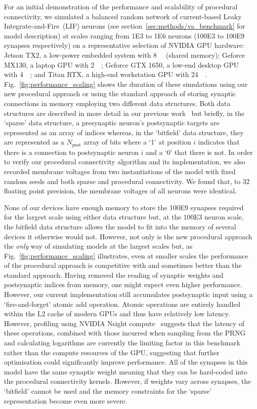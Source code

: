 \documentclass[9pt,a4paper]{amsart}
\begin{document}
For an initial demonstration of the performance and scalability of procedural connectivity, we simulated a balanced random network of current-based Leaky Integrate-and-Fire~(LIF) neurons (see section~\ref{sec:methods/va_benchmark} for model description) at scales ranging from \num{1E3} to \num{1E6} neurons (\num{100E3} to \num{100E9} synapses respectively) on a representative selection of NVIDIA GPU hardware:
Jetson TX2, a low-power embedded system with \SI{8}{\giga\byte} (shared memory);
Geforce MX130, a laptop GPU with \SI{2}{\giga\byte};
Geforce GTX 1650, a low-end desktop GPU with \SI{4}{\giga\byte};
and Titan RTX, a high-end workstation GPU with \SI{24}{\giga\byte}.
Fig.~\ref{fig:performance_scaling} shows the duration of these simulations using our new procedural approach or using the standard approach of storing synaptic connections in memory employing two different data structures.
Both data structures are described in more detail in our previous work~\citep{Knight2018} but briefly, in the `sparse' data structure, a presynaptic neuron's postsynaptic targets are represented as an array of indices whereas, in the `bitfield' data structure, they are represented as a $N_{\text{post}}$ array of bits where a `1' at position $i$ indicates that there is a connection to postsynaptic neuron $i$ and a `0' that there is not.
In order to verify our procedural connectivity algorithm and its implementation, we also recorded membrane voltages from two instantiations of the model with fixed random seeds and both sparse and procedural connectivity.
We found that, to \SI{32}{\bit} floating point  precision, the membrane voltages of all neurons were identical.

None of our devices have enough memory to store the \num{100E9} synapses required for the largest scale using either data structure but, at the \num{100E3} neuron scale, the bitfield data structure allows the model to fit into the memory of several devices it otherwise would not.
However, not only is the new procedural approach the \emph{only} way of simulating models at the largest scales but, as Fig.~\ref{fig:performance_scaling} illustrates, even at smaller scales the performance of the procedural approach is competitive with and sometimes better than the standard approach.
Having removed the reading of synaptic weights and postsynaptic indices from memory, one might expect even higher performance. 
However, our current implementation still accumulates postsynaptic input using a `fire-and-forget' atomic add operation.
Atomic operations are entirely handled within the L2 cache of modern GPUs and thus have relatively low latency.
However, profiling using NVIDIA Nsight compute~\citep{NVIDIACorporation2020} suggests that the latency of these operations, combined with those incurred when sampling from the PRNG and calculating logarithms are currently the limiting factor in this benchmark rather than the compute resources of the GPU, suggesting that further optimisation could significantly improve performance.
All of the synapses in this model have the same synaptic weight meaning that they can be hard-coded into the procedural connectivity kernels.
However, if weights vary across synapses, the `bitfield' cannot be used and the memory constraints for the `sparse' representation become even more severe.
%
\end{document}
